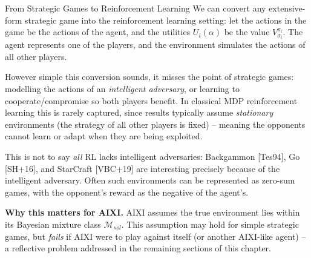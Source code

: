 \documentclass[aspectratio=169,10pt]{beamer}
\newcommand{\Mc}{\mathcal{M}}
\begin{document}
\begin{frame}{From Strategic Games to Reinforcement Learning}
  We can convert any extensive-form strategic game into the reinforcement
  learning setting: let the actions in the game be the actions of the
  agent, and the utilities $U_i(\alpha)$ be the value $V^{\pi_i}_{\sigma_i}$.
  The agent represents one of the players, and the environment simulates
  the actions of all other players.

  \vspace{0.3em}
  However simple this conversion sounds, it misses the point of strategic
  games: modelling the actions of an \emph{intelligent adversary}, or
  learning to cooperate/compromise so both players benefit. In classical
  MDP reinforcement learning this is rarely captured, since results
  typically assume \emph{stationary} environments (the strategy of all
  other players is fixed) -- meaning the opponents cannot learn or adapt
  when they are being exploited.

  \vspace{0.3em}
  This is not to say \emph{all} RL lacks intelligent adversaries:
  Backgammon {\footnotesize[Tes94]}, Go {\footnotesize[SH+16]}, and
  StarCraft {\footnotesize[VBC+19]} are interesting precisely because of
  the intelligent adversary. Often such environments can be represented
  as zero-sum games, with the opponent's reward as the negative of the
  agent's.

  \vspace{0.3em}
  \textbf{Why this matters for AIXI.} AIXI assumes the true environment
  lies within its Bayesian mixture class $\Mc_{sol}$. This assumption may
  hold for simple strategic games, but \emph{fails} if AIXI were to play
  against itself (or another AIXI-like agent) -- a reflective problem
  addressed in the remaining sections of this chapter.
\end{frame}
\end{document}
